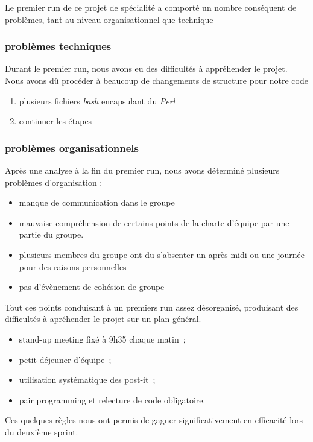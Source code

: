 \documentclass[11pt]{article}
\begin{document}
Le premier run de ce projet de spécialité a comporté un nombre conséquent de problèmes, tant au niveau organisationnel que technique

\subsubsection{problèmes techniques}

Durant le premier run, nous avons eu des difficultés à appréhender le projet. Nous avons dû procéder à beaucoup de changements de structure pour notre code
\begin{enumerate}
\item plusieurs fichiers \textit{bash} encapsulant du \textit{Perl}
\item continuer les étapes
\end{enumerate}

\subsubsection{problèmes organisationnels}

Après une analyse à la fin du premier run, nous avons déterminé plusieurs problèmes d'organisation : 

\begin{itemize}
\item manque de communication dans le groupe
\item mauvaise compréhension de certains points de la charte d'équipe par une partie du groupe.
\item plusieurs membres du groupe ont du s'absenter un après midi ou une journée pour des raisons personnelles
\item pas d'évènement de cohésion de groupe
\end{itemize}

Tout ces points conduisant à un premiers run assez désorganisé, produisant des difficultés à apréhender le projet sur un plan général.

\begin{itemize}
\item stand-up meeting fixé à 9h35 chaque matin~;
\item petit-déjeuner d'équipe~;
\item utilisation systématique des post-it~;
\item pair programming et relecture de code obligatoire.
\end{itemize}

  Ces quelques règles nous ont permis de gagner significativement en
  efficacité lors du deuxième sprint.
\end{document}
